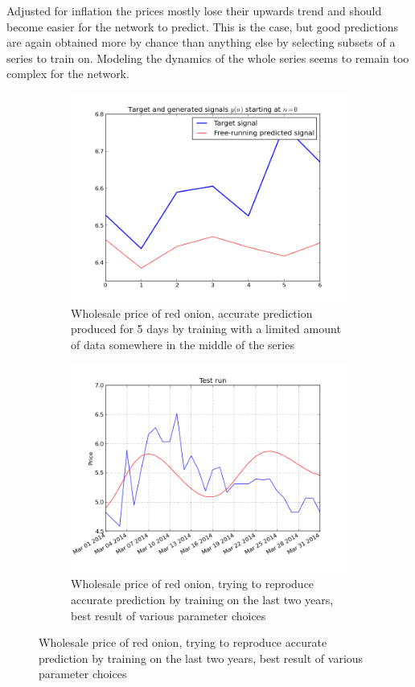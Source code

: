 Adjusted for inflation the prices mostly lose their upwards trend and should become easier for the network to predict. This is the case, but good predictions are again obtained more by chance than anything else by selecting subsets of a series to train on. Modeling the dynamics of the whole series seems to remain too complex for the network. 

\begin{figure}[!ht]
    \centering
        \begin{subfigure}[b]{.45\textwidth}
        \centering
        \includegraphics[width=\textwidth]{./img/plots/esn/red_onion_pred_6d_batch.png}
        \caption{Wholesale price of red onion, accurate prediction produced for 5 days by training with a limited amount of data somewhere in the middle of the series}
        \label{subfig:res_ch6d}
        \end{subfigure}
        \quad
        \begin{subfigure}[b]{.45\textwidth}
        \centering
        \includegraphics[width=\textwidth]{./img/plots/esn/red_onion_initN3000_30d.png}
        \caption{Wholesale price of red onion, trying to reproduce accurate prediction by training on the last two years, best result of various parameter choices}
        \label{subfig:res_ch30d}
        \end{subfigure}


\end{figure}
